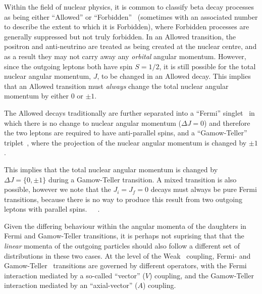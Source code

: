 Within the field of nuclear physics, it is common to classify beta decay processes as being either ``Allowed'' or ``Forbidden''~ (sometimes with an associated number to describe the extent to which it is Forbidden), where Forbidden processes are generally suppressed but not truly forbidden.  In an Allowed transition, the positron and anti-neutrino are treated as being created at the nuclear centre, and as a result they may not carry away any \emph{orbital} angular momentum.  However, since the outgoing leptons both have spin $S=1/2$, it is still possible for the total nuclear angular momentum, $J$, to be changed in an Allowed decay.  This implies that an Allowed transition must \emph{always} change the total nuclear angular momentum by either $0$ or $\pm1$.  
~

The Allowed decays traditionally are further separated into a ``Fermi'' singlet~ in which there is no change to nuclear angular momentum ($\Delta J = 0$) and therefore the two leptons are required to have anti-parallel spins, and a ``Gamow-Teller'' triplet~\cite{severijns_beck_cuncic_2006}, where the projection of the nuclear angular momentum is changed by $\pm1$.%

This implies that the total nuclear angular momentum is changed by $\Delta J = \{0, \pm1\}$ during a Gamow-Teller transition.  A mixed transition is also possible, however we note that the $J_i = J_f = 0$ decays must always be pure Fermi transitions, because there is no way to produce this result from two outgoing leptons with parallel spins.~\cite{krane}~\cite{wong1990}~\cite{severijns_beck_cuncic_2006}.

Given the differing behaviour within the angular momenta of the daughters in Fermi and Gamow-Teller transitions, it is perhaps not suprising that that the \emph{linear} momenta of the outgoing particles should also follow a different set of distributions in these two cases.  At the level of the Weak~ coupling, Fermi- and Gamow-Teller~ transitions are governed by different operators, with the Fermi interaction mediated by a so-called ``vector'' ($V$) coupling, and the Gamow-Teller interaction mediated by an ``axial-vector'' ($A$) coupling.
~

